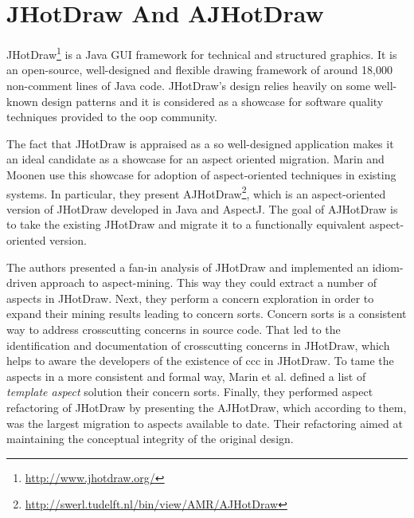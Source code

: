 \section{JHotDraw And AJHotDraw}\label{JHotDraw And AJHotDraw}
JHotDraw\footnote{\url{http://www.jhotdraw.org/}} is a Java GUI framework for technical and structured graphics. 
It is an open-source, well-designed and flexible drawing framework of around 18,000 non-comment lines of Java code. 
JHotDraw's  design relies heavily on some well-known design patterns\cite{gamma1995design} and it is considered as a showcase for software quality techniques provided to the \ac{oop} community. 

The fact that JHotDraw is appraised as a so well-designed application makes it an ideal candidate as a showcase for an aspect oriented migration. 
Marin and Moonen \cite{marinajhotdraw} use this showcase for adoption of aspect-oriented techniques in existing systems. 
In particular, they present AJHotDraw\footnote{\url{http://swerl.tudelft.nl/bin/view/AMR/AJHotDraw}}, which is an aspect-oriented version of JHotDraw developed in Java and AspectJ. 
The goal of AJHotDraw is to take the existing JHotDraw and migrate it to a functionally equivalent aspect-oriented version. 

The authors presented a fan-in analysis of JHotDraw \cite{marin2004identifying} and implemented an idiom-driven approach to aspect-mining. 
This way they could extract a number of aspects in JHotDraw. 
Next, they perform a concern exploration in order to expand their mining results leading to concern sorts.
Concern sorts is a consistent way to address crosscutting concerns in source code.
That led to the identification and documentation of crosscutting concerns in JHotDraw, which helps to aware the developers of the existence of \ac{ccc} in JHotDraw.
To tame the aspects in a more consistent and formal way, Marin et al. defined a list of \textit{template aspect} solution their concern sorts.
Finally, they performed aspect refactoring of JHotDraw by presenting the AJHotDraw, which according to them, was the largest migration to aspects available to date.
Their refactoring aimed at maintaining the conceptual integrity of the original design.

